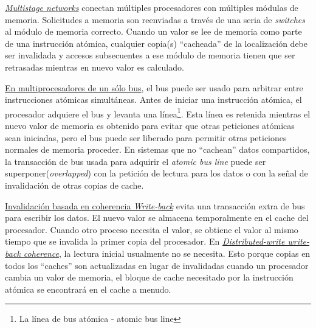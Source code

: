 \underline{\textit{Multistage networks}} conectan múltiples procesadores con múltiples módulas de memoria. Solicitudes a memoria son reenviadas a través de una seria de \textit{switches} al módulo de memoria correcto. Cuando un valor se lee de memoria como parte de una instrucción atómica, cualquier copia(s) ``cacheada'' de la localización debe ser invalidada y accesos subsecuentes a ese módulo de memoria tienen que ser retrasadas mientras en nuevo valor es calculado. 

\underline{En multiprocesadores de un sólo bus}, el bus puede ser usado para arbitrar entre instrucciones atómicas simultáneas. Antes de iniciar una instrucción atómica, el procesador adquiere el bus y levanta una línea\footnote{La línea de bus atómica - atomic bus line}. Esta línea es retenida mientras el nuevo valor de memoria es obtenido para evitar que otras peticiones atómicas sean iniciadas, pero el bus puede ser liberado para permitir otras peticiones normales de memoria proceder. En sistemas que no ``cachean'' datos compartidos, la transacción de bus usada para adquirir el \textit{atomic bus line} puede ser superponer(\textit{overlapped}) con la petición de lectura para los datos o con la señal de invalidación de otras copias de cache. 

\underline{Invalidación basada en coherencia \textit{Write-back}} evita una transacción extra de bus para escribir los datos. El nuevo valor se almacena temporalmente en el cache del procesador. Cuando otro proceso necesita el valor, se obtiene el valor al mismo tiempo que se invalida la primer copia del procesador. En \underline{\textit{Distributed-write write-back coherence}}, la lectura inicial usualmente no se necesita. Esto porque copias en todos los ``caches'' son actualizadas en lugar de invalidadas cuando un procesador cambia un valor de memoria, el bloque de cache necesitado por la instrucción atómica se encontrará en el cache a menudo.

